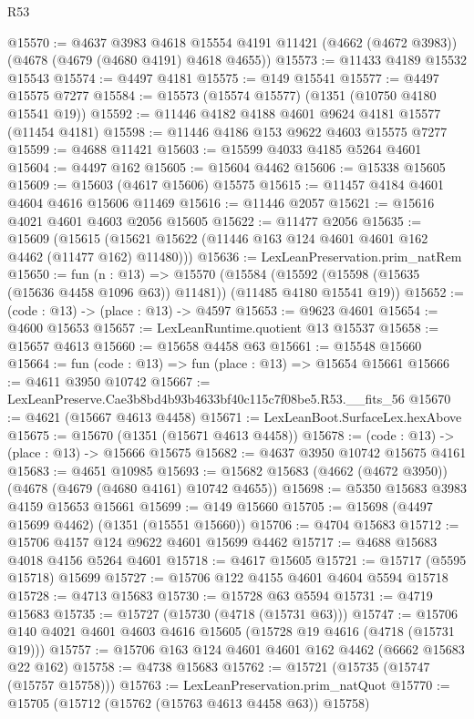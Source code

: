 \begin{lexlean}{R53}
\begin{coremodule}
@15570 := @4637
    @3983
    @4618
    @15554
    @4191
    @11421
    (@4662 (@4672 @3983))
    (@4678 (@4679 (@4680 @4191) @4618 @4655))
@15573 := @11433 @4189 @15532 @15543
@15574 := @4497 @4181
@15575 := @149 @15541
@15577 := @4497 @15575 @7277
@15584 := @15573 (@15574 @15577) (@1351 (@10750 @4180 @15541 @19))
@15592 := @11446 @4182 @4188 @4601 @9624 @4181 @15577 (@11454 @4181)
@15598 := @11446 @4186 @153 @9622 @4603 @15575 @7277
@15599 := @4688 @11421
@15603 := @15599 @4033 @4185 @5264 @4601
@15604 := @4497 @162
@15605 := @15604 @4462
@15606 := @15338 @15605
@15609 := @15603 (@4617 @15606) @15575
@15615 := @11457 @4184 @4601 @4604 @4616 @15606 @11469
@15616 := @11446 @2057
@15621 := @15616 @4021 @4601 @4603 @2056 @15605
@15622 := @11477 @2056
@15635 := @15609
    (@15615 (@15621 @15622 (@11446 @163 @124 @4601 @4601 @162 @4462 (@11477 @162) @11480)))
@15636 := LexLeanPreservation.prim_natRem
@15650 := fun (n : @13) =>
  @15570
    (@15584 (@15592 (@15598 (@15635 (@15636 @4458 @1096 @63)) @11481)) (@11485 @4180 @15541 @19))
@15652 := (code : @13) -> (place : @13) -> @4597
@15653 := @9623 @4601
@15654 := @4600 @15653
@15657 := LexLeanRuntime.quotient @13 @15537
@15658 := @15657 @4613
@15660 := @15658 @4458 @63
@15661 := @15548 @15660
@15664 := fun (code : @13) => fun (place : @13) => @15654 @15661
@15666 := @4611 @3950 @10742
@15667 := LexLeanPreserve.Cae3b8bd4b93b4633bf40c115c7f08be5.R53.__fits_56
@15670 := @4621 (@15667 @4613 @4458)
@15671 := LexLeanBoot.SurfaceLex.hexAbove
@15675 := @15670 (@1351 (@15671 @4613 @4458))
@15678 := (code : @13) -> (place : @13) -> @15666 @15675
@15682 := @4637 @3950 @10742 @15675 @4161
@15683 := @4651 @10985
@15693 := @15682 @15683 (@4662 (@4672 @3950)) (@4678 (@4679 (@4680 @4161) @10742 @4655))
@15698 := @5350 @15683 @3983 @4159 @15653 @15661
@15699 := @149 @15660
@15705 := @15698 (@4497 @15699 @4462) (@1351 (@15551 @15660))
@15706 := @4704 @15683
@15712 := @15706 @4157 @124 @9622 @4601 @15699 @4462
@15717 := @4688 @15683 @4018 @4156 @5264 @4601
@15718 := @4617 @15605
@15721 := @15717 (@5595 @15718) @15699
@15727 := @15706 @122 @4155 @4601 @4604 @5594 @15718
@15728 := @4713 @15683
@15730 := @15728 @63 @5594
@15731 := @4719 @15683
@15735 := @15727 (@15730 (@4718 (@15731 @63)))
@15747 := @15706 @140 @4021 @4601 @4603 @4616 @15605 (@15728 @19 @4616 (@4718 (@15731 @19)))
@15757 := @15706 @163 @124 @4601 @4601 @162 @4462 (@6662 @15683 @22 @162)
@15758 := @4738 @15683
@15762 := @15721 (@15735 (@15747 (@15757 @15758)))
@15763 := LexLeanPreservation.prim_natQuot
@15770 := @15705 (@15712 (@15762 (@15763 @4613 @4458 @63)) @15758)

\end{coremodule}
\end{lexlean}
